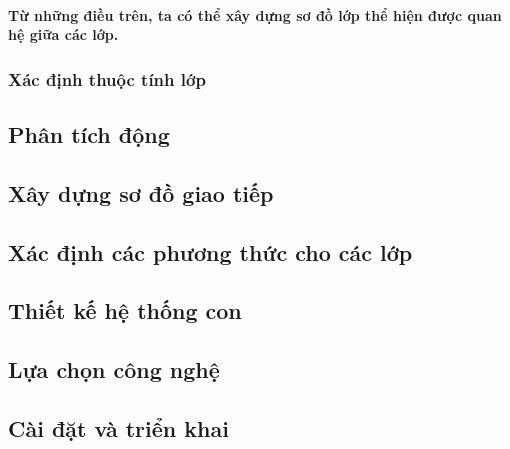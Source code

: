 \documentclass{article}
\begin{document}
    \paragraph{\textnormal{
      Từ những điều trên, ta có thể xây dựng sơ đồ lớp thể hiện được quan hệ giữa các lớp.
    }}

    \subsubsection{Xác định thuộc tính lớp}

  \subsection{Phân tích động}
    \subsection{Xây dựng sơ đồ giao tiếp}

    \subsection{Xác định các phương thức cho các lớp}

  \subsection{Thiết kế hệ thống con}

  \subsection{Lựa chọn công nghệ}

  \subsection{Cài đặt và triển khai}
\end{document}
